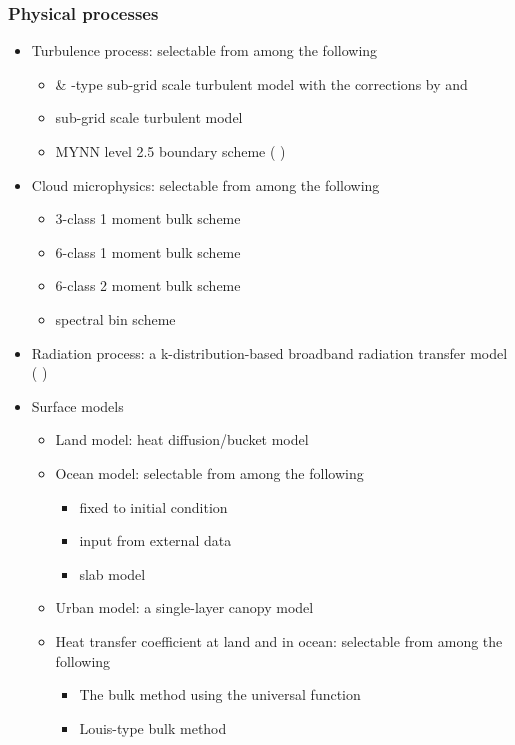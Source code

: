 \subsubsection{Physical processes}
\begin{itemize}
\item Turbulence process: selectable from among the following
  \begin{itemize}
  \item \citet{smagorinsky_1963} \& \citet{lilly_1962}-type sub-grid scale turbulent model
    with the corrections by \citet{Brown_etal_1994} and \citet{Scotti_1993}
  \item \citet{Deardorff_1980} sub-grid scale turbulent model
  \item MYNN level 2.5 boundary scheme ( \citet{my_1982,nakanishi_2004} )
  \end{itemize}
\item Cloud microphysics: selectable from among the following
  \begin{itemize}
  \item 3-class 1 moment bulk scheme \citep{kessler_1969}
  \item 6-class 1 moment bulk scheme \citep{tomita_2008}
  \item 6-class 2 moment bulk scheme \citep{sn_2014}
  \item spectral bin scheme \citep{suzuki_etal_2010}
  \end{itemize}
\item Radiation process: a k-distribution-based broadband radiation transfer model ( \citet{sekiguchi_2008} )
\item Surface models
  \begin{itemize}
  \item Land model: heat diffusion/bucket model
  \item Ocean model: selectable from among the following
    \begin{itemize}
    \item fixed to initial condition
    \item input from external data
    \item slab model
    \end{itemize}
  \item Urban model: a single-layer canopy model \citep{kusaka_2001}
  \item Heat transfer coefficient at land and in ocean: selectable from among the following
    \begin{itemize}
    \item The bulk method using the universal function \citep{beljaars_1991,wilson_2001}
    \item Louis-type bulk method \citep{uno_1995}
    \end{itemize}
  \end{itemize}
\end{itemize}

